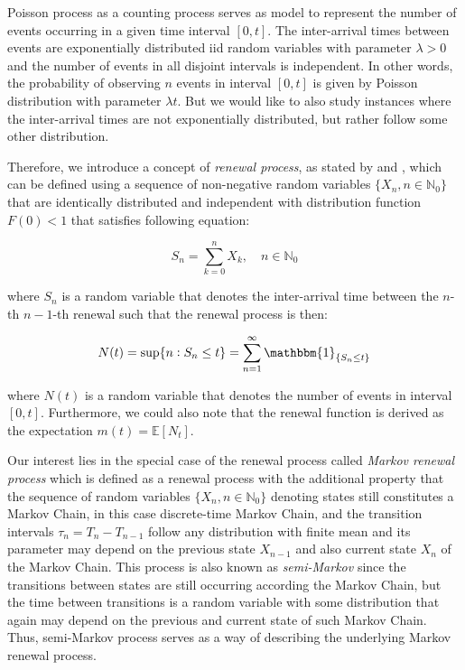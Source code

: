 Poisson process as a counting process serves as model to represent the number of events occurring in a given time interval $[0,t]$. The inter-arrival times 
between events are exponentially distributed iid random variables with parameter $\lambda>0$ and the number of events in all disjoint intervals is independent.
In other words, the probability of observing $n$ events in interval $[0,t]$ is given by Poisson distribution with parameter $\lambda t$. But we would like to also
study instances where the inter-arrival times are not exponentially distributed, but rather follow some other distribution.

Therefore, we introduce a concept of \textit{renewal process}, as stated by  \citep{Praskova2012} and \citep{Mitov2014}, which can be defined using a sequence of non-negative random variables $\{X_n,n \in \mathbb{N}_0\}$ that are identically distributed and independent with 
distribution function $F(0)<1$ that satisfies following equation:

\begin{equation}
    S_n = \sum_{k=0}^{n} X_k, \quad n \in \mathbb{N}_0
\end{equation}

where $S_n$ is a random variable that denotes the inter-arrival time between the $n$-th $n-1$-th renewal such that the renewal process is then:

\begin{equation}
    N(t) = \sup\{n: S_n \leq t\} = \sum_{n=1}^{\infty} \mathbbm{1}_{\{S_n \leq t\}}
\end{equation}

where $N(t)$ is a random variable that denotes the number of events in interval $[0,t]$. Furthermore, we could also note that the renewal function is 
derived as the expectation $m(t)=\mathbb{E}[N_t]$.

Our interest lies in the special case of the renewal process called \textit{Markov renewal process} which is defined as a renewal process with the additional property 
that the sequence of random variables $\{X_n,n \in \mathbb{N}_0\}$ denoting states still constitutes a Markov Chain, in this case discrete-time Markov Chain, and the transition intervals $\tau_n = T_n - T_{n-1}$ follow
any distribution with finite mean and its parameter may depend on the previous state $X_{n-1}$ and also current state $X_n$ of the Markov Chain. This process is also known as
\textit{semi-Markov} since the transitions between states are still occurring according the Markov Chain, but the time between transitions is a random variable with some distribution that again
may depend on the previous and current state of such Markov Chain. Thus, semi-Markov process serves as a way of describing the underlying Markov renewal process. \citep{Medhi2012}

